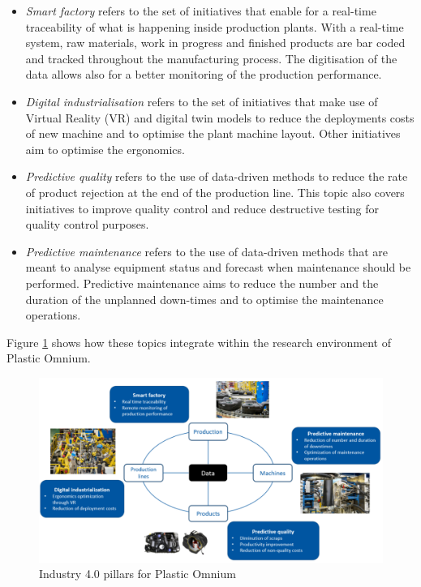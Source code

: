 \begin{itemize}
    \item \textit{Smart factory} refers to the set of initiatives that enable for a real-time traceability of what is happening inside production plants. With a real-time system, raw materials, work in progress and finished products are bar coded and tracked throughout the manufacturing process. The digitisation of the data allows also for a better monitoring of the production performance.
    \item \textit{Digital industrialisation} refers to the set of initiatives that make use of Virtual Reality (VR) and digital twin models to reduce the deployments costs of new machine and to optimise the plant machine layout. Other initiatives aim to optimise the ergonomics. 
    \item \textit{Predictive quality} refers to the use of data-driven methods to reduce the rate of product rejection at the end of the production line. This topic also covers initiatives to improve quality control and reduce destructive testing for quality control purposes.  
    \item \textit{Predictive maintenance} refers to the use of data-driven methods that are meant to analyse equipment status and forecast when maintenance should be performed. Predictive maintenance aims to reduce the number and the duration of the unplanned down-times and to optimise the maintenance operations.
\end{itemize}
%
Figure \ref{fig:pillars} shows how these topics integrate within the research environment of Plastic Omnium.
%
\begin{figure}
\centerline{\includegraphics[scale=0.50]{images/chapter_1/Digitalisation_pillars.png}}
\caption{Industry 4.0 pillars for Plastic Omnium}
\label{fig:pillars}
\end{figure}
